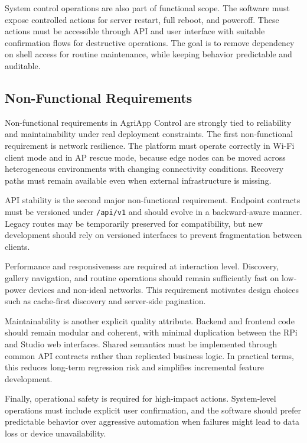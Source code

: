 System control operations are also part of functional scope. The software must expose controlled actions for server restart, full reboot, and poweroff. These actions must be accessible through API and user interface with suitable confirmation flows for destructive operations. The goal is to remove dependency on shell access for routine maintenance, while keeping behavior predictable and auditable.

\subsection{Non-Functional Requirements}
Non-functional requirements in AgriApp Control are strongly tied to reliability and maintainability under real deployment constraints. The first non-functional requirement is network resilience. The platform must operate correctly in Wi-Fi client mode and in AP rescue mode, because edge nodes can be moved across heterogeneous environments with changing connectivity conditions. Recovery paths must remain available even when external infrastructure is missing.

API stability is the second major non-functional requirement. Endpoint contracts must be versioned under \texttt{/api/v1} and should evolve in a backward-aware manner. Legacy routes may be temporarily preserved for compatibility, but new development should rely on versioned interfaces to prevent fragmentation between clients.

Performance and responsiveness are required at interaction level. Discovery, gallery navigation, and routine operations should remain sufficiently fast on low-power devices and non-ideal networks. This requirement motivates design choices such as cache-first discovery and server-side pagination.

Maintainability is another explicit quality attribute. Backend and frontend code should remain modular and coherent, with minimal duplication between the RPi and Studio web interfaces. Shared semantics must be implemented through common API contracts rather than replicated business logic. In practical terms, this reduces long-term regression risk and simplifies incremental feature development.

Finally, operational safety is required for high-impact actions. System-level operations must include explicit user confirmation, and the software should prefer predictable behavior over aggressive automation when failures might lead to data loss or device unavailability.

